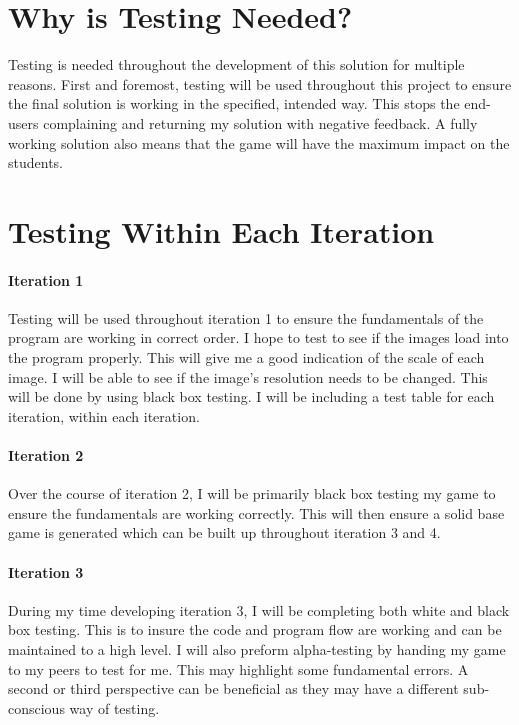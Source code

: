 \documentclass[12pt]{report}
\begin{document}
\pagebreak

\section{Why is Testing Needed?}
Testing is needed throughout the development of this solution for multiple reasons. First and foremost, testing will be used throughout this project to ensure the final solution is working in the specified, intended way. This stops the end-users complaining and returning my solution with negative feedback. A fully working solution also means that the game will have the maximum impact on the students. 

\section{Testing Within Each Iteration}
\paragraph{Iteration 1}
Testing will be used throughout iteration 1 to ensure the fundamentals of the program are working in correct order. I hope to test to see if the images load into the program properly. This will give me a good indication of the scale of each image. I will be able to see if the image's resolution needs to be changed. This will be done by using black box testing. I will be including a test table for each iteration, within each iteration.

\paragraph{Iteration 2}
Over the course of iteration 2, I will be primarily black box testing my game to ensure the fundamentals are working correctly. This will then ensure a solid base game is generated which can be built up throughout iteration 3 and 4. 

\paragraph{Iteration 3}
During my time developing iteration 3,  I will be completing both white and black box testing. This is to insure the code and program flow are working and can be maintained to a high level. I will also preform alpha-testing by handing my game to my peers to test for me. This may highlight some fundamental errors. A second or third perspective can be beneficial as they may have a different sub-conscious way of testing. 
\end{document}
